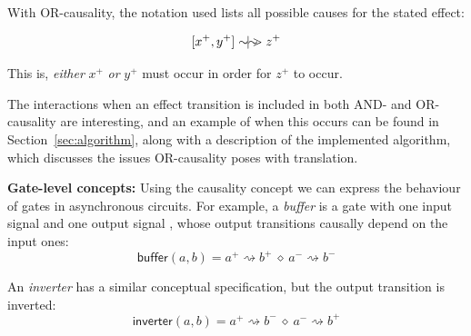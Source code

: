 \documentclass[british,conference,compsoc]{IEEEtran}
\begin{document}

With OR-causality, the notation used lists all possible causes for the stated effect:


\[
[x^{+}, y^{+}]\sim\hspace{-1.5mm}|\hspace{-1.5mm}\sim\hspace{-1.5mm}>z^{+}
\]

This is, \emph{either} $x^{+}$ \emph{or} $y^{+}$ must occur in order for 
$z^{+}$ to occur.

The interactions when an effect transition is included in both AND- and OR-causality are interesting, and
an example of when this occurs can be found in Section~\ref{sec:algorithm}, along with a description
of the implemented algorithm, which discusses the issues OR-causality poses with translation.

\textbf{Gate-level concepts:} Using the causality concept we can express
the behaviour of gates in asynchronous circuits. For example, a \emph{buffer}
is a gate with one input signal and one output signal ,
whose output transitions causally depend on the input ones:
\[
\mathsf{buffer}(a, b)=a^{+}\rightsquigarrow b^{+}\ \diamond\
a^{-}\rightsquigarrow b^{-}
\]

\noindent An \emph{inverter} has a similar conceptual specification, but the
output transition is inverted:
\[
\mathsf{inverter}(a, b)=a^{+}\rightsquigarrow b^{-}\ \diamond\
a^{-}\rightsquigarrow b^{+}
\]
\end{document}
